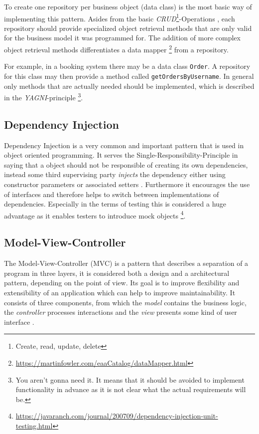 To create one repository per business object (data class) is the most basic way of implementing this pattern. Asides from the basic \emph{CRUD}\footnote{Create, read, update, delete}-Operations , each repository should provide specialized object retrieval methods that are only valid for the business model it was programmed for. The addition of more complex object retrieval methods differentiates a data mapper \footnote{\href{https://martinfowler.com/eaaCatalog/dataMapper.html}{https://martinfowler.com/eaaCatalog/dataMapper.html}} from a repository. 

For example, in a booking system there may be a data class \texttt{Order}. A repository for this class may then provide a method called \texttt{getOrdersByUsername}. In general only methods that are actually needed should be implemented, which is described in the \emph{YAGNI}-principle \footnote{You aren't gonna need it. It means that it should be avoided to implement functionality in advance as it is not clear what the actual requirements will be.}.

\subsection{Dependency Injection}
\label{sec:di}
Dependency Injection is a very common and important pattern that is used in object oriented programming. It serves the Single-Responsibility-Principle in saying that a object should not be responsible of creating its own dependencies, instead some third supervising party \emph{injects} the dependency either using constructor parameters or associated setters \cite[p.159]{clean-code}. Furthermore it encourages the use of interfaces and therefore helps to switch between implementations of dependencies. Especially in the terms of testing this is considered a huge advantage as it enables testers to introduce mock objects \footnote{\href{https://javaranch.com/journal/200709/dependency-injection-unit-testing.html}{https://javaranch.com/journal/200709/dependency-injection-unit-testing.html}}.


\subsection{Model-View-Controller}
\label{sec:mvc}
The Model-View-Controller (MVC) is a pattern that describes a separation of a program in three layers, it is considered both a design and a architectural pattern, depending on the point of view.  Its goal is to improve flexibility and extensibility of an application which can help to improve maintainability. It consists of three components, from which the \emph{model} contains the business logic, the \emph{controller} processes interactions and the \emph{view} presents some kind of user interface \cite{mvc}.


